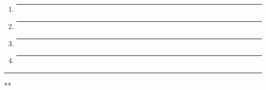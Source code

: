 \subsection{}\label{section-46}

\begin{enumerate}
\def\labelenumi{\arabic{enumi}.}
\item
  \begin{center}\rule{0.5\linewidth}{0.5pt}\end{center}
\item
  \begin{center}\rule{0.5\linewidth}{0.5pt}\end{center}
\item
  \begin{center}\rule{0.5\linewidth}{0.5pt}\end{center}
\item
  \begin{center}\rule{0.5\linewidth}{0.5pt}\end{center}
\end{enumerate}

\begin{center}\rule{0.5\linewidth}{0.5pt}\end{center}

**